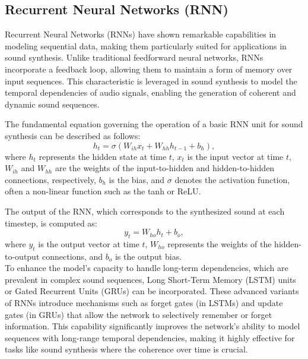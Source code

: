 \documentclass[11pt,a4paper,oneside]{report}
\begin{document}
\subsection{Recurrent Neural Networks (RNN)}

Recurrent Neural Networks (RNNs) \cite{srivastava2015unsupervised, chiappa2017recurrent, ha2018world} have shown remarkable capabilities in modeling sequential data, making them particularly suited for applications in sound synthesis. 
Unlike traditional feedforward neural networks, RNNs incorporate a feedback loop, allowing them to maintain a form of memory over input sequences. 
This characteristic is leveraged in sound synthesis to model the temporal dependencies of audio signals, enabling the generation of coherent and dynamic sound sequences.

The fundamental equation governing the operation of a basic RNN unit for sound synthesis can be described as follows:
\begin{equation}
h_t = \sigma(W_{ih} x_t + W_{hh} h_{t-1} + b_h),
\end{equation}
where $h_t$ represents the hidden state at time $t$, $x_t$ is the input vector at time $t$, $W_{ih}$ and $W_{hh}$ are the weights of the input-to-hidden and hidden-to-hidden connections, respectively, $b_h$ is the bias, and $\sigma$ denotes the activation function, often a non-linear function such as the tanh or ReLU.

The output of the RNN, which corresponds to the synthesized sound at each timestep, is computed as:
\begin{equation}
y_t = W_{ho} h_t + b_o,
\end{equation}
where $y_t$ is the output vector at time $t$, $W_{ho}$ represents the weights of the hidden-to-output connections, and $b_o$ is the output bias. \\
To enhance the model's capacity to handle long-term dependencies, which are prevalent in complex sound sequences, Long Short-Term Memory (LSTM) \cite{yu2019review} units or Gated Recurrent Units (GRUs) \cite{dey2017gate} can be incorporated. 
These advanced variants of RNNs introduce mechanisms such as forget gates (in LSTMs) and update gates (in GRUs) that allow the network to selectively remember or forget information. 
This capability significantly improves the network's ability to model sequences with long-range temporal dependencies, making it highly effective for tasks like sound synthesis where the coherence over time is crucial.
\end{document}
